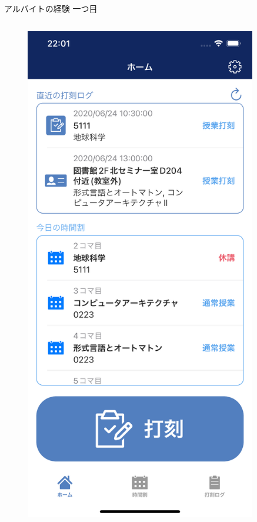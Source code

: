 \documentclass[12pt, unicode]{beamer}
\begin{document}
\begin{frame}{アルバイトの経験 一つ目}
  \begin{columns}
    \begin{column}{0.3\textwidth}
      \begin{figure}[h]
        \centering
        \includegraphics[width=0.9\textwidth]{pictures/PyrrolineHome.png}
      \end{figure}
    \end{column}


\end{columns}
\end{frame}
\end{document}

